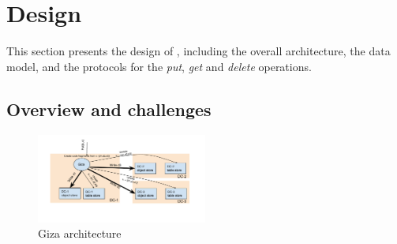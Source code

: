 









\section{Design}

This section presents the design of {\name}, including the overall architecture,
the data model, and the protocols for the {\em put}, {\em get} and {\em delete} operations.

\subsection{Overview and challenges}

\begin{figure}[tp]
\centering
\includegraphics[width=0.5\textwidth]{fig/Giza}
\caption{Giza architecture\label{fig:arch}}
\end{figure}

